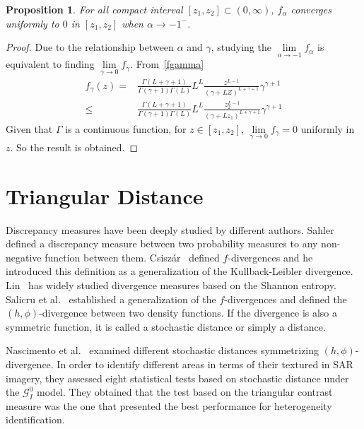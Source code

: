 \documentclass[journal]{IEEEtran}
\newtheorem{proposition}{Proposition}
\numberwithin{equation}{section}
\newenvironment{dem}[1][Proof]{\begin{proof}[{\it #1}]}{\end{proof}}
\newcommand{\pa}[1]{\ensuremath{\left( #1 \right)}}
\begin{document}
\begin{proposition}
	For all compact interval $[z_{1},z_{2}]\subset\pa{0,\infty}$, $f_{\alpha}$ converges uniformly to $0$ in $[z_{1},z_{2}]$ when $\alpha\to -1^{-}$.
	\label{pr: convergenciauniforme2}
\end{proposition}

\begin{dem} 
	Due to the relationship between $\alpha$ and $\gamma$, studying the $\lim\limits_{\alpha\to-1} f_{\alpha}$ is equivalent to finding
	$\lim\limits_{\gamma\to0} f_{\gamma}.$
	From~\ref{fgamma}
	\begin{align*}
	 f_{\gamma}\pa{z} = &\frac{\Gamma\pa{L+\gamma+1}}{\Gamma\pa{\gamma+1}\Gamma\pa{L}}
	L^{L} \frac{z^{L-1}}{(\gamma+LZ)^{L+\gamma+1}} \gamma^{\gamma +1}  \\
	\leq& \frac{\Gamma\pa{L+\gamma+1}}{\Gamma\pa{\gamma+1}\Gamma\pa{L}}
	L^{L} \frac{z_2^{L-1}}{(\gamma+Lz_1)^{L+\gamma+1}} \gamma^{\gamma +1} 
	\end{align*}
	Given that $\Gamma$ is a continuous function, for $z \in [z_{1},z_{2}]$, $\lim\limits_{\gamma\to0} f_{\gamma}=0$ uniformly in $z$. So the result is obtained.
\end{dem}

\section{Triangular Distance}
\label{DTsection}

Discrepancy measures have been deeply studied by different authors. Sahler~\cite{Sahler1970} defined a discrepancy measure between two probability measures to any non-negative
function between them. Csisz\'ar~\cite{Csiszar1967} defined $f$-divergences and he introduced this definition as a generalization of the Kullback-Leibler divergence. Lin~\cite{Lin1991} has widely studied divergence measures based on the Shannon entropy.  Salicru et al.~\cite{Salicru1994} established a generalization of the $f$-divergences and defined the $(h,\phi)$-divergence between two density functions. If the divergence is also a symmetric function, it is called a stochastic distance or simply a distance.

Nascimento et al.~\cite{Nascimento2009} examined different stochastic distances symmetrizing $(h,\phi)$-divergence. In order to identify different areas in terms of their textured in SAR imagery, they assessed eight statistical tests based on stochastic distance under the $\mathcal{G}_I^0$ model. They obtained that the test based on the triangular contrast measure was the one that presented the best performance for heterogeneity identification.
\end{document}
